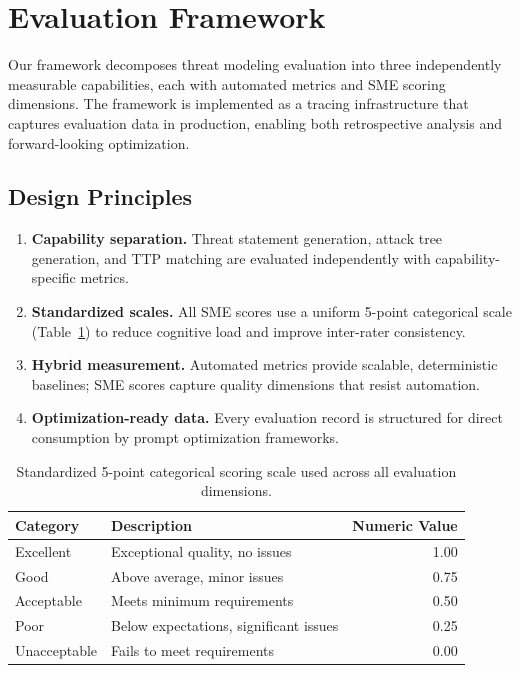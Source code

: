 \section{Evaluation Framework}
\label{sec:framework}

Our framework decomposes threat modeling evaluation into three independently measurable capabilities, each with automated metrics and SME scoring dimensions. The framework is implemented as a tracing infrastructure that captures evaluation data in production, enabling both retrospective analysis and forward-looking optimization.

\subsection{Design Principles}

\begin{enumerate}
    \item \textbf{Capability separation.} Threat statement generation, attack tree generation, and TTP matching are evaluated independently with capability-specific metrics.
    \item \textbf{Standardized scales.} All SME scores use a uniform 5-point categorical scale (Table~\ref{tab:scale}) to reduce cognitive load and improve inter-rater consistency.
    \item \textbf{Hybrid measurement.} Automated metrics provide scalable, deterministic baselines; SME scores capture quality dimensions that resist automation.
    \item \textbf{Optimization-ready data.} Every evaluation record is structured for direct consumption by prompt optimization frameworks.
\end{enumerate}

\begin{table}[t]
\centering
\caption{Standardized 5-point categorical scoring scale used across all evaluation dimensions.}
\label{tab:scale}
\begin{tabular}{@{}llr@{}}
\toprule
\textbf{Category} & \textbf{Description} & \textbf{Numeric Value} \\
\midrule
Excellent & Exceptional quality, no issues & 1.00 \\
Good & Above average, minor issues & 0.75 \\
Acceptable & Meets minimum requirements & 0.50 \\
Poor & Below expectations, significant issues & 0.25 \\
Unacceptable & Fails to meet requirements & 0.00 \\
\bottomrule
\end{tabular}
\end{table}

